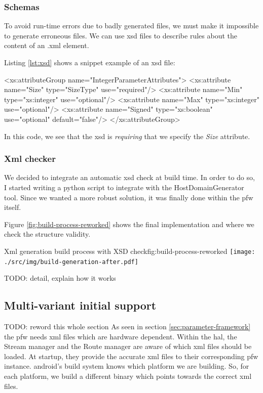 \subsubsection{Schemas}
To avoid run-time errors due to badly generated files, we must make it impossible to generate erroneous files.
We can use \gls{xsd} files to describe rules about the content of an .xml element.

Listing \ref{lst:xsd} shows a snippet example of an \gls{xsd} file:

\begin{code}[language=XML, caption=XSD rules for an Integer parameter, label=lst:xsd]
<xs:attributeGroup name="IntegerParameterAttributes">
    <xs:attribute name="Size" type="SizeType" use="required"/>
    <xs:attribute name="Min" type="xs:integer" use="optional"/>
    <xs:attribute name="Max" type="xs:integer" use="optional"/>
    <xs:attribute name="Signed" type="xs:boolean" use="optional" default="false"/>
</xs:attributeGroup>
\end{code}

In this code, we see that the \gls{xsd} is \emph{requiring} that we specify the \emph{Size} attribute.

\subsubsection{Xml checker}

We decided to integrate an automatic \gls{xsd} check at build time. In order to do so, I started writing a \gls{python} script
to integrate with the HostDomainGenerator tool. Since we wanted a more robust solution, it was finally done within the \gls{pfw} itself.

Figure \ref{fig:build-process-reworked} shows the final implementation and where we check the structure validity.

\begin{figureGraphics}{Xml generation build process with XSD check}{fig:build-process-reworked}
    \texttt{[image: ./src/img/build-generation-after.pdf]}
\end{figureGraphics}

TODO: detail, explain how it works


\subsection{Multi-variant initial support}
TODO: reword this whole section
As seen in section \ref{sec:parameter-framework} the \gls{pfw} needs
\gls{xml} files which are hardware dependent.
Within the \gls{hal}, the Stream manager and the Route manager are aware of
which \gls{xml} files should be loaded. At startup, they provide the
accurate \gls{xml} files to their corresponding \gls{pfw} instance.
\gls{android}'s build system knows which platform we are building.
So, for each platform, we build a different binary which points towards the correct \gls{xml} files.

